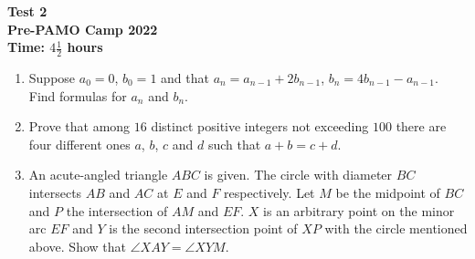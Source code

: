 \documentclass{article}
\begin{document}
	\thispagestyle{empty}
	
	\begin{center}
		\textbf{\Large Test 2}
		\\ \vspace{1em}
		\textbf{\large Pre-PAMO Camp 2022}
		\\ \vspace{1em}
		\textbf{\large Time: $4\frac{1}{2}$ hours}
	\end{center}
	
	\vspace{24pt}
	
	\begin{enumerate}[itemsep=12pt]
		
		\item 
		Suppose $a_0 = 0$, $b_0 = 1$ and that $a_n = a_{n-1} + 2b_{n-1}$, $b_n =    4b_{n-1} -a_{n-1}$. Find formulas for $a_n$ and $b_n$.
	
		\item %
		Prove that among $16$ distinct positive integers not exceeding $100$ there are four different ones $a$, $b$, $c$ and $d$ such that $a+b = c+d$.
		
		\item %
		An acute-angled triangle $ABC$ is given. The circle with diameter $BC$ intersects $AB$ and $AC$ at $E$ and $F$ respectively. Let $M$ be the midpoint of $BC$ and $P$ the intersection of $AM$ and $EF$. $X$ is an arbitrary point on the minor arc $EF$ and $Y$ is the second intersection point of $XP$ with the circle mentioned above. Show that $\angle XAY = \angle XYM$.
		
	\end{enumerate}
	
	
	
\end{document}
